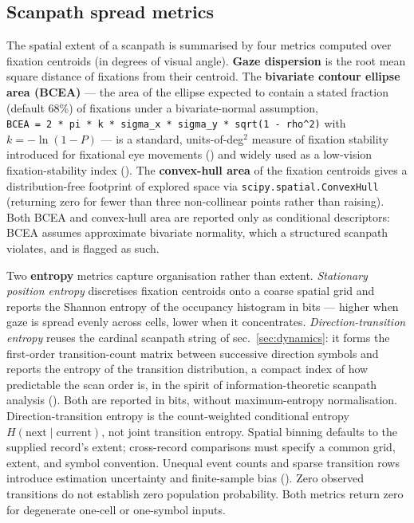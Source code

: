 \documentclass[
]{article}
\newcounter{none} %
\begin{document}
\subsection{Scanpath spread metrics}\label{scanpath-spread-metrics}

The spatial extent of a scanpath is summarised by four metrics computed
over fixation centroids (in degrees of visual angle). \textbf{Gaze
dispersion} is the root mean square distance of fixations from their
centroid. The \textbf{bivariate contour ellipse area (BCEA)} --- the
area of the ellipse expected to contain a stated fraction (default 68\%)
of fixations under a bivariate-normal assumption,
\texttt{BCEA\ =\ 2\ *\ pi\ *\ k\ *\ sigma\_x\ *\ sigma\_y\ *\ sqrt(1\ -\ rho\^{}2)}
with \(k = -\ln(1-P)\) --- is a standard, units-of-deg\(^2\) measure of
fixation stability introduced for fixational eye movements
() and widely used as a
low-vision fixation-stability index
(). The
\textbf{convex-hull area} of the fixation centroids gives a
distribution-free footprint of explored space via
\texttt{scipy.spatial.ConvexHull} (returning zero for fewer than three
non-collinear points rather than raising). Both BCEA and convex-hull
area are reported only as conditional descriptors: BCEA assumes
approximate bivariate normality, which a structured scanpath violates,
and is flagged as such.

Two \textbf{entropy} metrics capture organisation rather than extent.
\emph{Stationary position entropy} discretises fixation centroids onto a
coarse spatial grid and reports the Shannon entropy of the occupancy
histogram in bits --- higher when gaze is spread evenly across cells,
lower when it concentrates. \emph{Direction-transition entropy} reuses
the cardinal scanpath string of sec.~\ref{sec:dynamics}: it forms the
first-order transition-count matrix between successive direction symbols
and reports the entropy of the transition distribution, a compact index
of how predictable the scan order is, in the spirit of
information-theoretic scanpath analysis
(). Both
are reported in bits, without maximum-entropy normalisation.
Direction-transition entropy is the count-weighted conditional entropy
\(H(\mathrm{next}\mid\mathrm{current})\), not joint transition entropy.
Spatial binning defaults to the supplied record's extent; cross-record
comparisons must specify a common grid, extent, and symbol convention.
Unequal event counts and sparse transition rows introduce estimation
uncertainty and finite-sample bias
(). Zero observed
transitions do not establish zero population probability. Both metrics
return zero for degenerate one-cell or one-symbol inputs.
\end{document}
